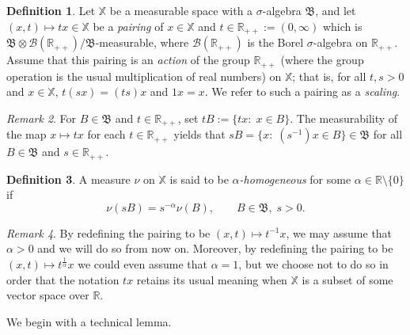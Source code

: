 \documentclass[12pt]{amsart}
\numberwithin{equation}{section}
\numberwithin{figure}{section}
\theoremstyle{plain} \newtheorem{theorem}{Theorem}[section]
\theoremstyle{plain} \newtheorem{proposition}[theorem]{Proposition}
\theoremstyle{plain} \newtheorem{lemma}[theorem]{Lemma}
\theoremstyle{plain} \newtheorem{corollary}[theorem]{Corollary}
\theoremstyle{definition} \newtheorem{definition}[theorem]{Definition}
\theoremstyle{definition} \newtheorem{notation}[theorem]{Notation}
\theoremstyle{remark} \newtheorem{remark}[theorem]{Remark}
\theoremstyle{remark} \newtheorem{example}[theorem]{Example}
\theoremstyle{definition} \newtheorem{assumption}{Assumption}
\newcommand{\bR}{\mathbb{R}}
\newcommand{\bX}{\mathbb{X}}
\newcommand{\cB}{\mathcal{B}}
\newcommand{\salg}{\mathfrak{B}}
\begin{document}
\begin{definition}
  Let $\bX$ be a measurable space with a $\sigma$-algebra $\salg$, and
  let $(x,t)\mapsto tx\in\bX$ be a \emph{pairing} of $x\in\bX$ and
  $t\in\bR_{++}:=(0,\infty)$ which is $\salg \otimes \cB(\bR_{++}) /
  \salg$-measurable, where $\cB(\bR_{++})$ is the Borel
  $\sigma$-algebra on $\bR_{++}$. Assume that this pairing is an {\em
    action} of the group $\bR_{++}$ (where the group operation is the
  usual multiplication of real numbers) on $\bX$; that is, for all
  $t,s>0$ and $x\in\bX$, $t(sx)=(ts)x$ and $1 x = x$.  We refer to
  such a pairing as a \emph{scaling}.
\end{definition} 

\begin{remark}
  \label{remark:scaling-one-s}
  For $B\in\salg$ and $t\in\bR_{++}$, set $tB:=\{tx:\; x\in B\}$.  The
  measurability of the map $x\mapsto tx$ for each $t\in\bR_{++}$
  yields that $s B=\{x:\; (s^{-1})x\in B\}\in\salg$ for all
  $B\in\salg$ and $s\in\bR_{++}$.
\end{remark}  

\begin{definition}
  A measure $\nu$ on $\bX$ is said to be \emph{$\alpha$-homogeneous}
  for some $\alpha\in\bR \setminus \{0\}$ if
  \begin{equation}
    \label{eq:nu-x-homogeneous}
    \nu(sB)=s^{-\alpha}\nu(B),\qquad B\in\salg,\; s>0. 
  \end{equation}
\end{definition}

\begin{remark}
  By redefining the pairing to be $(x,t) \mapsto t^{-1} x$, we may
  assume that $\alpha > 0$ and we will do so from now on.  Moreover,
  by redefining the pairing to be $(x,t) \mapsto t^{\frac{1}{\alpha}}
  x$ we could even assume that $\alpha = 1$, but we choose not to do
  so in order that the notation $t x$ retains its usual meaning when
  $\bX$ is a subset of some vector space over $\bR$.
\end{remark}

We begin with a technical lemma.
\end{document}
